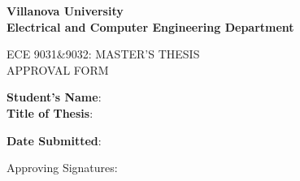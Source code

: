 

\begin{center}
\bfseries
Villanova University\\
Electrical and Computer Engineering Department

\vspace{1cm}

\uppercase{ECE 9031\&9032: Master's Thesis\\ Approval Form}
\end{center}

\vspace*{0.30cm} 
\noindent \textbf{Student's Name}: \underline{} \\ %
  
\vspace{1cm}
\noindent
\noindent \textbf{ Title of Thesis}: \underline{} \ 

\vspace{1cm}
\noindent
\noindent \textbf{Date Submitted}: \underline{} \ 


\vspace{1cm}
\noindent Approving Signatures:\\
\vspace{.5in}



